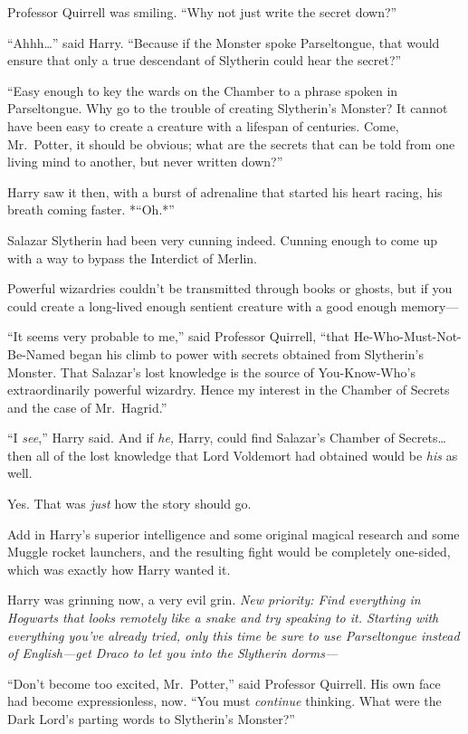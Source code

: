 Professor Quirrell was smiling. ``Why not just write the secret down?''

``Ahhh\ldots{}'' said Harry. ``Because if the Monster spoke
Parseltongue, that would ensure that only a true descendant of Slytherin
could hear the secret?''

``Easy enough to key the wards on the Chamber to a phrase spoken in
Parseltongue. Why go to the trouble of creating Slytherin's Monster? It
cannot have been easy to create a creature with a lifespan of centuries.
Come, Mr.~Potter, it should be obvious; what are the secrets that can be
told from one living mind to another, but never written down?''

Harry saw it then, with a burst of adrenaline that started his heart
racing, his breath coming faster. *``Oh.*''

Salazar Slytherin had been very cunning indeed. Cunning enough to come
up with a way to bypass the Interdict of Merlin.

Powerful wizardries couldn't be transmitted through books or ghosts, but
if you could create a long-lived enough sentient creature with a good
enough memory---

``It seems very probable to me,'' said Professor Quirrell, ``that
He-Who-Must-Not-Be-Named began his climb to power with secrets obtained
from Slytherin's Monster. That Salazar's lost knowledge is the source of
You-Know-Who's extraordinarily powerful wizardry. Hence my interest in
the Chamber of Secrets and the case of Mr.~Hagrid.''

``I \emph{see},'' Harry said. And if \emph{he,} Harry, could find
Salazar's Chamber of Secrets\ldots{} then all of the lost knowledge that
Lord Voldemort had obtained would be \emph{his} as well.

Yes. That was \emph{just} how the story should go.

Add in Harry's superior intelligence and some original magical research
and some Muggle rocket launchers, and the resulting fight would be
completely one-sided, which was exactly how Harry wanted it.

Harry was grinning now, a very evil grin. \emph{New priority: Find
everything in Hogwarts that looks remotely like a snake and try speaking
to it. Starting with everything you've already tried, only this time be
sure to use Parseltongue instead of English---get Draco to let you into
the Slytherin dorms---}

``Don't become too excited, Mr.~Potter,'' said Professor Quirrell. His
own face had become expressionless, now. ``You must \emph{continue}
thinking. What were the Dark Lord's parting words to Slytherin's
Monster?''

